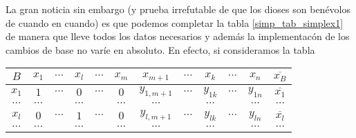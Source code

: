 La gran noticia sin embargo (y prueba irrefutable de que los dioses son benévolos de cuando en cuando) es que podemos completar la tabla \ref{simp_tab_simplex1} de manera que lleve todos los datos necesarios y además la implementacón de los cambios de base no varíe en absoluto. En efecto, si consideramos la tabla
\begin{table}[H]
	\centering
	\begin{tabular}{c|cccccccccc|c}
		$B$                                 & $x_1$                   & $\cdots$                     & $x_l$                   & $\cdots$                     & $x_m$                   & $x_{m+1}$                                & $\cdots$                     & $x_k$                                & $\cdots$                    & $x_n$                                 & $\overline{x_B}$                               \\ \hline
		$x_1$                               & $1$                     & $\cdots$                     & $0$                     & $\cdots$                     & $0$                     & $y_{1,m+1}$                              & $\cdots$                     & $y_{1k}$                             & $\cdots$                    & $y_{1n}$                              & $\overline{x_1}$                               \\
		$\cdots$                            & $\cdots$                &                              & $\cdots$                &                              & $\cdots$                & $\cdots$                                 &                              & $\cdots$                             &                             & $\cdots$                              & $\cdots$                                       \\
		$x_l$                               & $0$                     & $\cdots$                     & $1$                     & $\cdots$                     & $0$                     & $y_{l,m+1}$                              & $\cdots$                     & $y_{lk}$                             & $\cdots$                    & $y_{ln}$                              & $\overline{x_l}$                               \\
		$\cdots$                            & $\cdots$                &                              & $\cdots$                &                              & $\cdots$                & $\cdots$                                 &                              & $\cdots$                             &                             & $\cdots$                              & $\cdots$                                       \\

\end{tabular}
\end{table}
